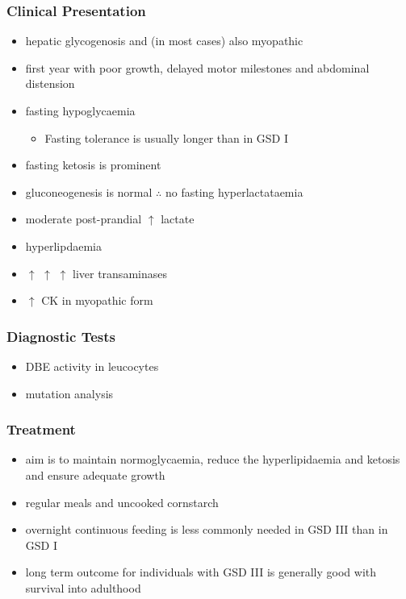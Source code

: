 \documentclass{scrartcl}
\begin{document}
\subsubsection{Clinical Presentation}
\label{sec:org5f57be7}
\begin{itemize}
\item hepatic glycogenosis and (in most cases) also myopathic
\item first year with poor growth, delayed motor milestones and abdominal
distension
\item fasting hypoglycaemia 
\begin{itemize}
\item Fasting tolerance is usually longer than in GSD I
\end{itemize}
\item fasting ketosis is prominent
\item gluconeogenesis is normal \(\therefore\) no fasting hyperlactataemia
\item moderate post-prandial \(\uparrow\) lactate
\item hyperlipdaemia
\item \(\uparrow\) \(\uparrow\) \(\uparrow\) liver transaminases
\item \(\uparrow\) CK in myopathic form
\end{itemize}
\subsubsection{Diagnostic Tests}
\label{sec:orgdf3d17c}
\begin{itemize}
\item DBE activity in leucocytes
\item mutation analysis
\end{itemize}
\subsubsection{Treatment}
\label{sec:orgebfebc3}
\begin{itemize}
\item aim is to maintain normoglycaemia, reduce the hyperlipidaemia and ketosis and
ensure adequate growth
\item regular meals and uncooked cornstarch
\item overnight continuous feeding is less commonly needed in GSD III than
in GSD I
\item long term outcome for individuals with GSD III is generally good
with survival into adulthood
\end{itemize}
\end{document}
